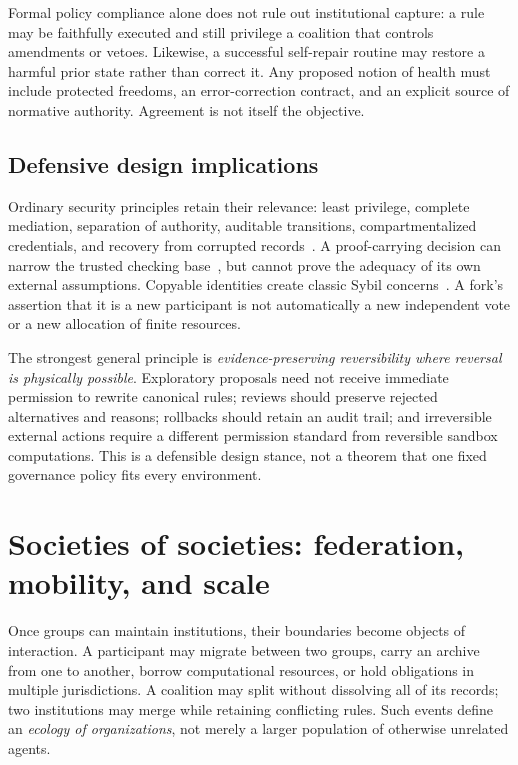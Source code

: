 \documentclass[11pt,letterpaper]{article}
\theoremstyle{plain}
\theoremstyle{definition}
\theoremstyle{remark}
\begin{document}
Formal policy compliance alone does not rule out institutional capture: a rule may be faithfully executed and still privilege a coalition that controls amendments or vetoes. Likewise, a successful self-repair routine may restore a harmful prior state rather than correct it. Any proposed notion of health must include protected freedoms, an error-correction contract, and an explicit source of normative authority. Agreement is not itself the objective.

\subsection{Defensive design implications}

Ordinary security principles retain their relevance: least privilege, complete mediation, separation of authority, auditable transitions, compartmentalized credentials, and recovery from corrupted records~\cite{saltzer}. A proof-carrying decision can narrow the trusted checking base~\cite{necula}, but cannot prove the adequacy of its own external assumptions. Copyable identities create classic Sybil concerns~\cite{douceur}. A fork's assertion that it is a new participant is not automatically a new independent vote or a new allocation of finite resources.

The strongest general principle is \emph{evidence-preserving reversibility where reversal is physically possible}. Exploratory proposals need not receive immediate permission to rewrite canonical rules; reviews should preserve rejected alternatives and reasons; rollbacks should retain an audit trail; and irreversible external actions require a different permission standard from reversible sandbox computations. This is a defensible design stance, not a theorem that one fixed governance policy fits every environment.

\section{Societies of societies: federation, mobility, and scale}\label{sec:ecology}

Once groups can maintain institutions, their boundaries become objects of interaction. A participant may migrate between two groups, carry an archive from one to another, borrow computational resources, or hold obligations in multiple jurisdictions. A coalition may split without dissolving all of its records; two institutions may merge while retaining conflicting rules. Such events define an \emph{ecology of organizations}, not merely a larger population of otherwise unrelated agents.
\end{document}
